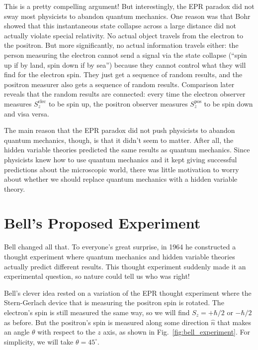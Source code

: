 This is a pretty compelling argument!  But interestingly, the EPR
paradox did not sway most physicists to abandon quantum mechanics.
One reason was that Bohr showed that this instantaneous state collapse
across a large distance did not actually violate special relativity.
No actual object travels from the electron to the positron.  But more
significantly, no actual information travels either: the person
measuring the electron cannot send a signal via the state collapse
(``spin up if by land, spin down if by sea'') because they cannot
control what they will find for the electron spin.  They just get a
sequence of random results, and the positron measurer also gets a
sequence of random results.  Comparison later reveals that the random
results are connected:  every time the electron observer measures $S_z^\text{elec}$ to be spin up, the positron observer measures $S_z^\text{pos}$ to be spin down and visa versa.

The main reason that the EPR paradox did not push physicists to
abandon quantum mechanics, though, is that it didn't seem to matter.
After all, the hidden variable theories predicted the same results as
quantum mechanics.  Since physicists knew how to use quantum mechanics
and it kept giving successful predictions about the microscopic world,
there was little motivation to worry about whether we should replace
quantum mechanics with a hidden variable theory.

\section{Bell's Proposed Experiment}
\label{sec:bell_experiment}
\label{section:bell}

Bell changed all that.  To everyone's great surprise, in 1964 he
constructed a thought experiment where quantum mechanics and hidden
variable theories actually predict different results.  This thought
experiment suddenly made it an experimental question, so nature could
tell us who was right!

Bell's clever idea rested on a variation of the EPR thought experiment
where the Stern-Gerlach device that is measuring the positron spin is
rotated.  The electron's spin is still measured the same way, so we
will find $S_z = +\hbar/2$ or $-\hbar/2$ as before.  But the
positron's spin is measured along some direction $\hat n$ that makes
an angle $\theta$ with respect to the $z$ axis, as shown in
Fig.~\ref{fig:bell_experiment}.  For simplicity, we will take
$\theta = 45^\circ$.

